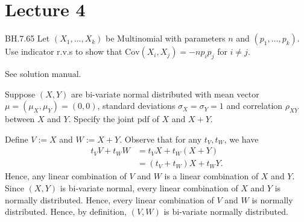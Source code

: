 \documentclass[lectures]{subfiles}
\begin{document}
\section{Lecture 4}

\newcommand{\corrr}{\text{Corr}}
\newcommand{\covv}{\text{Cov}}


\begin{exercise} BH.7.65 Let $(X_1, \ldots, X_k)$ be Multinomial with parameters $n$ and $(p_1, \ldots, p_k)$. Use indicator r.v.s to show that $\covv(X_i, X_j) = -n p_i p_j$ for $i \neq j$.

\begin{solution}
See solution manual.
\end{solution}
\end{exercise}


\begin{exercise}
Suppose $(X,Y)$ are bi-variate normal distributed with mean vector $\mu = (\mu_X, \mu_Y) = (0,0)$, standard deviations $\sigma_X = \sigma_Y = 1$ and correlation $\rho_{X Y}$ between $X$ and $Y$. Specify the joint pdf of $X$ and $X + Y$.
\begin{solution}
Define $V := X$ and $W := X + Y$. Observe that for any $t_V, t_W$, we have
\begin{align}
    t_V V + t_W W &= t_V X + t_W (X + Y) \\
    &= (t_V + t_W) X + t_W Y.
\end{align}
Hence, any linear combination of $V$ and $W$ is a linear combination of $X$ and $Y$. Since $(X,Y)$ is bi-variate normal, every linear combination of $X$ and $Y$ is normally distributed. Hence, every linear combination of $V$ and $W$ is normally distributed. Hence, by definition, $(V,W)$ is bi-variate normally distributed.


\end{solution}
\end{exercise}
\end{document}
